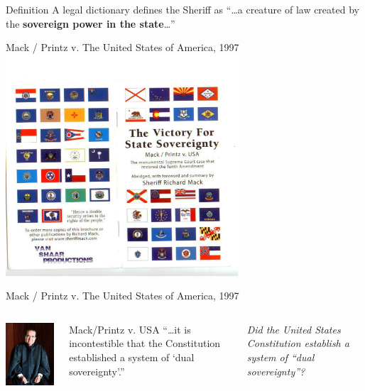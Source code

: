 \begin{frame}
    \begin{varblock}[0.8\textwidth]{Definition}
        A legal dictionary defines the Sheriff as ``\ldots a creature of law created by the \textbf{sovereign power in the state}\ldots'' 
    \end{varblock}
\end{frame}

\begin{frame}{Mack / Printz v. The United States of America, 1997}
    \centering
    \includegraphics[width=0.65\textwidth]{img/printz-mack.jpg} \\
\end{frame}

\begin{frame}{Mack / Printz v. The United States of America, 1997}
    \begin{columns}[onlytextwidth]
            \centering
            \includegraphics[height=0.75\textheight]{img/scalia.jpg} \\

            \begin{block}{Mack/Printz v. USA}
                ``\ldots it is incontestible that the Constitution established a system of `dual sovereignty'.''
            \end{block}
            \pause
            {
                \color{red}
                \emph{Did the United States Constitution establish a system of ``dual sovereignty''?}
            }
    \end{columns}
\end{frame}

